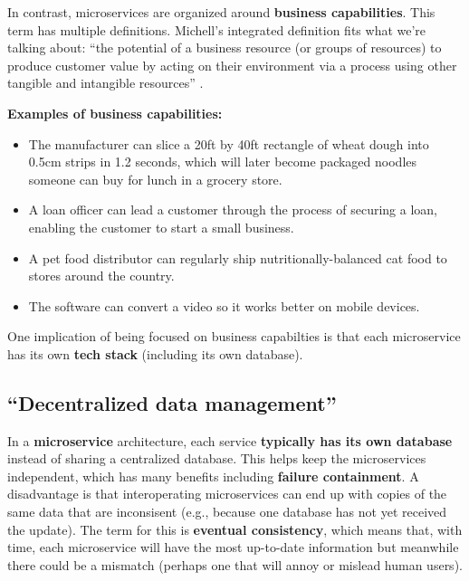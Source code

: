 \marginpar{\businessCapabilityDef\margindivider}\marginpar{\eventualConsistencyDef\margindivider}\marginpar{\techStackDef}
In contrast, microservices are organized around \textbf{business capabilities}. This term has multiple definitions. Michell's integrated definition fits what we're talking about: ``the potential of a business resource (or groups of resources) to produce customer value by acting on their environment via a process using other tangible and intangible resources'' \parencite{Michell2011AFA}. 

\spacer
\noindent\textbf{Examples of business capabilities:}\\

\begin{itemize}

\item The manufacturer can slice a 20ft by 40ft rectangle of wheat dough into 0.5cm strips in 1.2 seconds, which will later become packaged noodles someone can buy for lunch in a grocery store.

\item A loan officer can lead a customer through the process of securing a loan, enabling the customer to start a small business.

\item A pet food distributor can regularly ship nutritionally-balanced cat food to stores around the country.

\item The software can convert a video so it works better on mobile devices.

\end{itemize}

\spacer
One implication of being focused on business capabilties is that each microservice has its own \textbf{tech stack} (including its own database).

\nomargins
\subsection{``Decentralized data management''}

In a \textbf{microservice} architecture, each service \textbf{typically has its own database} instead of sharing a centralized database. This helps keep the microservices independent, which has many benefits including \textbf{failure containment}. A disadvantage is that interoperating microservices can end up with copies of the same data that are inconsisent (e.g., because one database has not yet received the update). The term for this is \textbf{eventual consistency}, which means that, with time, each microservice will have the most up-to-date information but meanwhile there could be a mismatch (perhaps one that will annoy or mislead human users).

